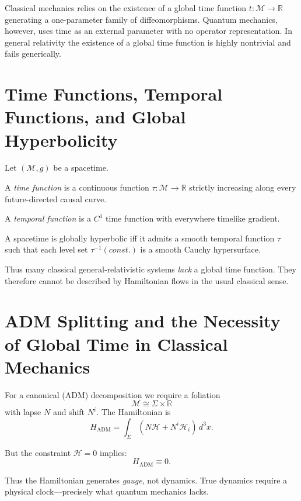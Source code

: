 \documentclass[12pt,oneside]{book}
\begin{document}
Classical mechanics relies on the existence of a global time function $t:\mathcal{M}\to\mathbb{R}$ generating a one-parameter family of diffeomorphisms.  
Quantum mechanics, however, uses time as an external parameter with no operator representation.  
In general relativity the existence of a global time function is highly nontrivial and fails generically.

\section{Time Functions, Temporal Functions, and Global Hyperbolicity}

Let $(\mathcal{M},g)$ be a spacetime.

\begin{definition}
A \emph{time function} is a continuous function $\tau:\mathcal{M}\to\mathbb{R}$ strictly increasing along every future-directed causal curve.
\end{definition}

\begin{definition}
A \emph{temporal function} is a $C^1$ time function with everywhere timelike gradient.
\end{definition}

\begin{theorem}
A spacetime is globally hyperbolic iff it admits a smooth temporal function $\tau$ such that each level set $\tau^{-1}(const.)$ is a smooth Cauchy hypersurface.
\end{theorem}

Thus many classical general-relativistic systems \emph{lack} a global time function.  
They therefore cannot be described by Hamiltonian flows in the usual classical sense.

\section{ADM Splitting and the Necessity of Global Time in Classical Mechanics}

For a canonical (ADM) decomposition we require a foliation
\[
\mathcal{M} \cong \Sigma \times \mathbb{R}
\]
with lapse $N$ and shift $N^i$.
The Hamiltonian is
\[
H_{\text{ADM}} = \int_{\Sigma} (N \mathcal{H} + N^i \mathcal{H}_i)\, d^3x.
\]

But the constraint $\mathcal{H}=0$ implies:
\[
H_{\text{ADM}} \equiv 0.
\]

Thus the Hamiltonian generates \emph{gauge}, not dynamics.  
True dynamics require a physical clock—precisely what quantum mechanics lacks.
\end{document}
